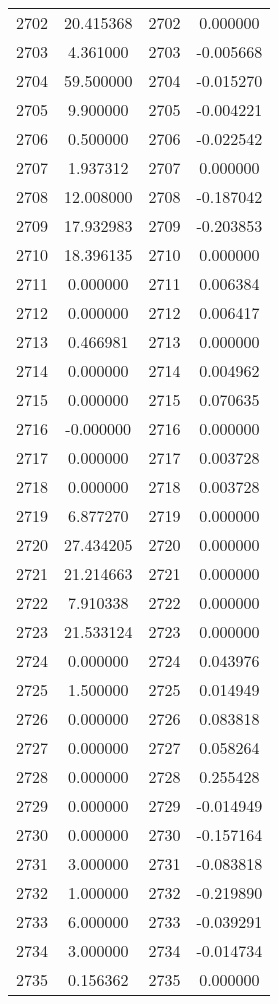 \documentclass[12pt]{article}
\begin{document}
\begin{longtable}{@{}cccc@{}}
2702 & 20.415368 & 2702 & 0.000000 \\
2703 & 4.361000 & 2703 & -0.005668 \\
2704 & 59.500000 & 2704 & -0.015270 \\
2705 & 9.900000 & 2705 & -0.004221 \\
2706 & 0.500000 & 2706 & -0.022542 \\
2707 & 1.937312 & 2707 & 0.000000 \\
2708 & 12.008000 & 2708 & -0.187042 \\
2709 & 17.932983 & 2709 & -0.203853 \\
2710 & 18.396135 & 2710 & 0.000000 \\
2711 & 0.000000 & 2711 & 0.006384 \\
2712 & 0.000000 & 2712 & 0.006417 \\
2713 & 0.466981 & 2713 & 0.000000 \\
2714 & 0.000000 & 2714 & 0.004962 \\
2715 & 0.000000 & 2715 & 0.070635 \\
2716 & -0.000000 & 2716 & 0.000000 \\
2717 & 0.000000 & 2717 & 0.003728 \\
2718 & 0.000000 & 2718 & 0.003728 \\
2719 & 6.877270 & 2719 & 0.000000 \\
2720 & 27.434205 & 2720 & 0.000000 \\
2721 & 21.214663 & 2721 & 0.000000 \\
2722 & 7.910338 & 2722 & 0.000000 \\
2723 & 21.533124 & 2723 & 0.000000 \\
2724 & 0.000000 & 2724 & 0.043976 \\
2725 & 1.500000 & 2725 & 0.014949 \\
2726 & 0.000000 & 2726 & 0.083818 \\
2727 & 0.000000 & 2727 & 0.058264 \\
2728 & 0.000000 & 2728 & 0.255428 \\
2729 & 0.000000 & 2729 & -0.014949 \\
2730 & 0.000000 & 2730 & -0.157164 \\
2731 & 3.000000 & 2731 & -0.083818 \\
2732 & 1.000000 & 2732 & -0.219890 \\
2733 & 6.000000 & 2733 & -0.039291 \\
2734 & 3.000000 & 2734 & -0.014734 \\
2735 & 0.156362 & 2735 & 0.000000 \\

\end{longtable}
\end{document}
